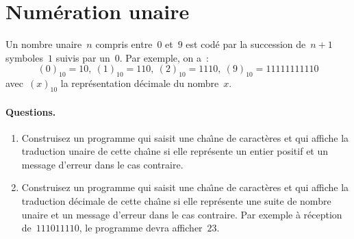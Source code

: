 \section{Num\'eration unaire}
\label{sec:NumUn}
Un  nombre  unaire~$n$ compris   entre~$0$  et~$9$ est  cod\'e par  la
succession de~${n+1}$ symboles~$1$ suivis par un~$0$.  Par exemple, on
a~:
$$
(0)_{10}= 10,\ (1)_{10}= 110,\ (2)_{10}=1110,\ (9)_{10} = 11111111110
$$
avec~$(x)_{10}$ la repr\'esentation d\'ecimale du nombre~$x$.
\paragraph{Questions.}
\begin{enumerate}
\item  Construisez   un programme   qui   saisit une  cha\^\i{}ne   de
  caract\`eres  et  qui   affiche   la  traduction unaire   de   cette
  cha\^\i{}ne  si elle repr\'esente   un entier positif et un  message
  d'erreur dans le cas contraire.
\item  Construisez  un programme    qui   saisit une   cha\^\i{}ne  de
  caract\`eres  et   qui affiche  la   traduction  d\'ecimale de cette
  cha\^\i{}ne  si elle repr\'esente une  suite de nombre  unaire et un
  message d'erreur dans le  cas contraire. Par exemple \`a r\'eception
  de~$111011110$, le programme devra afficher~$23$.
\end{enumerate}
